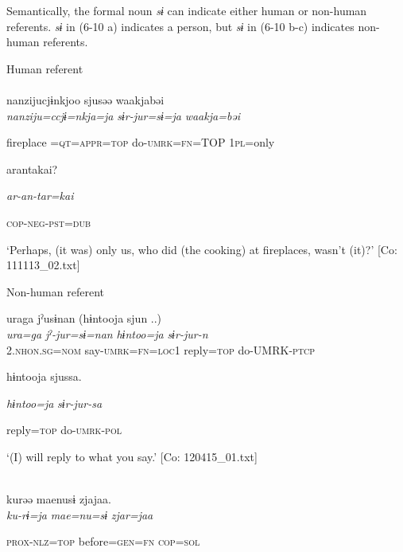 Semantically, the formal noun \textit{sɨ} can indicate either human or non-human referents. \textit{sɨ} in (6-10 a) indicates a person, but \textit{sɨ} in (6-10 b-c) indicates non-human referents.

\ea\label{ex:6-10}
 Human referent\\

 \ea{}\\
\gll  {\TM}  nanzijucjɨnkjoo  sjusəə  waakjabəi\\

      \textit{nanziju=ccjɨ=nkja=ja}  \textit{sɨr-jur=sɨ=ja}  \textit{waakja=bəi}

      fireplace =\textsc{qt}=\textsc{appr}=\textsc{top}  do-\textsc{umrk}=\textsc{fn}=TOP  1\textsc{pl}=only

      arantakai?

      \textit{ar-an-tar=kai}

      \textsc{cop}-\textsc{neg}-\textsc{pst}=\textsc{dub}

\glt ‘Perhaps, (it was) only us, who did (the cooking) at fireplaces, wasn’t (it)?’ [Co: 111113\_02.txt]
\z

  Non-human referent

 \ex {\TM}  uraga  jˀusɨnan  (hɨntooja  sjun ..)\\
\gll \textit{ura=ga}  \textit{jˀ-jur=sɨ=nan}  \textit{hɨntoo=ja}  \textit{sɨr-jur-n}\\

      2.\textsc{nhon}.\textsc{sg}=\textsc{nom}  say-\textsc{umrk}=\textsc{fn}=\textsc{loc}1  reply=\textsc{top}  do-UMRK-\textsc{ptcp}

      hɨntooja  sjussa.

      \textit{hɨntoo=ja}  \textit{sɨr-jur-sa}

      reply=\textsc{top}  do-\textsc{umrk}-\textsc{pol}

\glt ‘(I) will reply to what you say.’ [Co: 120415\_01.txt]
\z

 \ex{}\\
{\TM}
\gll  kurəə  {\textbar}mae{\textbar}nusɨ  zjajaa.\\

      \textit{ku-rɨ=ja}  \textit{mae=nu=sɨ}  \textit{zjar=jaa}

      \textsc{prox}-\textsc{nlz}=\textsc{top}  before=\textsc{gen}=\textsc{fn}  \textsc{cop}=\textsc{sol}

